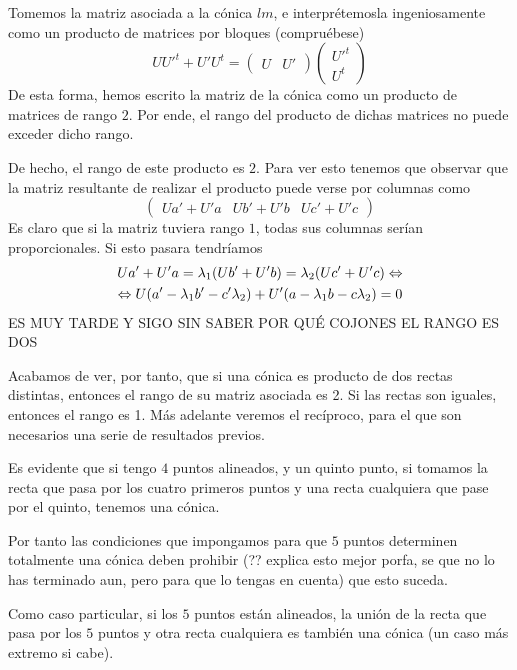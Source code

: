 Tomemos la matriz asociada a la cónica $lm$, e interprétemosla ingeniosamente como un producto de matrices por bloques (compruébese)
\[UU'^t+U'U^t=\left(\begin{array}{c|c}
U&U'
\end{array}\right)\left(\begin{array}{c}
U'^t\\
\hline U^t
\end{array}\right)\]
De esta forma, hemos escrito la matriz de la cónica como un producto de matrices de rango $2$. Por ende, el rango del producto de dichas matrices no puede exceder dicho rango.

De hecho, el rango de este producto es $2$. Para ver esto tenemos que observar que la matriz resultante de realizar el producto puede verse por columnas como
\[\left(\begin{array}{c|c|c}
Ua'+U'a&Ub'+U'b&Uc'+U'c
\end{array}\right)\]
Es claro que si la matriz tuviera rango $1$, todas sus columnas serían proporcionales. Si esto pasara tendríamos
\begin{multline}
	Ua'+U'a=\lambda_1(Ub'+U'b)=\lambda_2(Uc'+U'c)\Leftrightarrow\\
	\Leftrightarrow U(a'-\lambda_1b'-c'\lambda_2)+U'(a-\lambda_1b-c\lambda_2)=0
\end{multline}
ES MUY TARDE Y SIGO SIN SABER POR QUÉ COJONES EL RANGO ES DOS

Acabamos de ver, por tanto, que si una cónica es producto de dos rectas distintas, entonces el rango de su matriz asociada es 2. Si las rectas son iguales, entonces el rango es 1. Más adelante veremos el recíproco, para el que son necesarios una serie de resultados previos.

\begin{obs}
	Es evidente que si tengo $4$ puntos alineados, y un quinto punto, si tomamos la recta que pasa por los cuatro primeros puntos y una recta cualquiera que pase por el quinto, tenemos una cónica.
	
	Por tanto las condiciones que impongamos para que $5$ puntos determinen totalmente una cónica deben prohibir (?? explica esto mejor porfa, se que no lo has terminado aun, pero para que lo tengas en cuenta) que esto suceda.
	
	Como caso particular, si los $5$ puntos están alineados, la unión de la recta que pasa por los $5$ puntos y otra recta cualquiera es también una cónica (un caso más extremo si cabe).
\end{obs}
